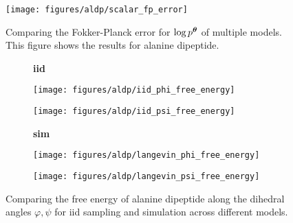 \begin{figure}
    \centering
    \texttt{[image: figures/aldp/scalar\_fp\_error]}
    \caption{Comparing the Fokker-Planck error for $\log p^{\bm{\theta}}$ of multiple models. This figure shows the results for alanine dipeptide.}
    \label{fig:aldp-fp-error}
\end{figure}

\begin{figure}
    \centering
    \begin{minipage}{\textwidth}
        \centering
        \begin{subfigure}[c]{0.08\textwidth}
            \textbf{iid}
        \end{subfigure}
        \begin{subfigure}[c]{0.2\textwidth}
            \centering
            \texttt{[image: figures/aldp/iid\_phi\_free\_energy]}
        \end{subfigure}
        \hspace{0.5cm}
        \begin{subfigure}[c]{0.2\textwidth}
            \centering
            \texttt{[image: figures/aldp/iid\_psi\_free\_energy]}
        \end{subfigure}
    \end{minipage}
    \vspace{0.5cm}
    \begin{minipage}{\textwidth}
        \centering
        \begin{subfigure}[c]{0.08\textwidth}
            \vspace{-0.5cm}
            \textbf{sim}
        \end{subfigure}
        \begin{subfigure}[c]{0.2\textwidth}
            \centering
            \texttt{[image: figures/aldp/langevin\_phi\_free\_energy]}
        \end{subfigure}
        \hspace{0.5cm}
        \begin{subfigure}[c]{0.2\textwidth}
            \centering
            \texttt{[image: figures/aldp/langevin\_psi\_free\_energy]}
        \end{subfigure}
    \end{minipage}
    \caption{Comparing the free energy of alanine dipeptide along the dihedral angles $\varphi, \psi$ for iid sampling and simulation across different models.}
    \label{fig:aldp-phi-psi-free-energy}
\end{figure}

